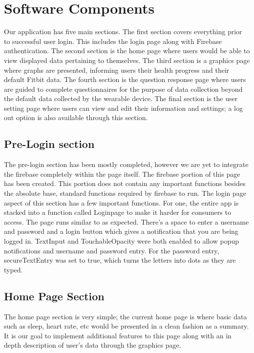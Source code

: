 \documentclass[]{book}
\begin{document}
\section{Software Components}\label{software-components}

Our application has five main sections. The first section covers
everything prior to successful user login. This includes the login page
along with Firebase authentication. The second section is the home page
where users would be able to view displayed data pertaining to
themselves. The third section is a graphics page where graphs are
presented, informing users their health progress and their default
Fitbit data. The fourth section is the question response page where
users are guided to complete questionnaires for the purpose of data
collection beyond the default data collected by the wearable device. The
final section is the user setting page where users can view and edit
their information and settings; a log out option is also available
through this section.

\subsection{Pre-Login section}\label{pre-login-section}

The pre-login section has been mostly completed, however we are yet to
integrate the firebase completely within the page itself. The firebase
portion of this page has been created. This portion does not contain any
important functions besides the absolute base, standard functions
required by firebase to run. The login page aspect of this section has a
few important functions. For one, the entire app is stacked into a
function called Loginpage to make it harder for consumers to access. The
page runs similar to as expected. There's a space to enter a username
and password and a login button which gives a notification that you are
being logged in. TextInput and TouchableOpacity were both enabled to
allow popup notifications and username and password entry. For the
password entry, secureTextEntry was set to true, which turns the letters
into dots as they are typed.

\subsection{Home Page Section}\label{home-page-section}

The home page section is very simple; the current home page is where
basic data such as sleep, heart rate, etc would be presented in a clean
fashion as a summary. It is our goal to implement additional features to
this page along with an in depth description of user's data through the
graphics page.
\end{document}
